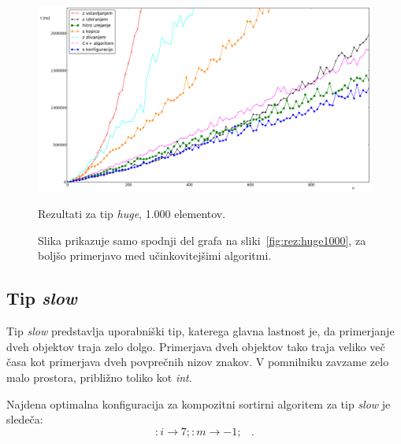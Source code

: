 \documentclass[a4paper,oneside,12pt]{article}
\newcommand{\lra}{\ensuremath{\longrightarrow}}
\newcommand{\edot}{\;\;\;.}
\begin{document}
\begin{figure}[h!]
    \includegraphics[width=\textwidth]{slike/huge1000zoom.pdf}
    \vspace{-0.7cm}
    \caption[Rezultati za tip \emph{huge}, 1.000 el. -- izrez]{Rezultati za tip
    \emph{huge}, 1.000 elementov.}
    \caption*{{\small Slika
    prikazuje samo spodnji del grafa na sliki~\ref{fig:rez:huge1000}, za
    boljšo primerjavo med učinkovitejšimi algoritmi.}}
    \label{fig:rez:hugeblizu}
\end{figure}

\pagebreak
\mbox{}

\pagebreak

\subsection{Tip \emph{slow}}
\label{chapter:rez:slow}
Tip \emph{slow} predstavlja uporabniški tip, katerega glavna lastnost je, da primerjanje dveh objektov
traja zelo dolgo. Primerjava dveh objektov tako traja veliko več časa kot primerjava dveh povprečnih
nizov znakov. V pomnilniku zavzame zelo malo prostora, približno toliko kot \emph{int}.

Najdena optimalna konfiguracija za kompozitni sortirni algoritem za tip \emph{slow} je sledeča:
\[ :i \lra 7;:m \lra -1; \edot \]
\end{document}
